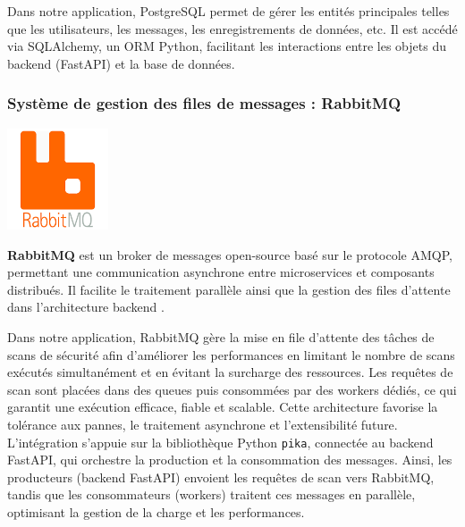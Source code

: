\begin{justify}
        Dans notre application, PostgreSQL permet de gérer les entités principales telles que les utilisateurs, les messages, les enregistrements de données, etc. Il est accédé via SQLAlchemy, un ORM Python, facilitant les interactions entre les objets du backend (FastAPI) et la base de données.
    \subsubsection{Système de gestion des files de messages : RabbitMQ}
        \begin{minipage}{0.25\textwidth}
            \centering
            \includegraphics[width=3cm]{chapitres/ch2/img/logiciel/rabbitmq.png}
        \end{minipage}
        \begin{minipage}{0.75\textwidth} 
            \justifying
            \textbf{RabbitMQ} est un broker de messages open-source basé sur le protocole AMQP, permettant une communication asynchrone entre microservices et composants distribués. Il facilite le traitement parallèle ainsi que la gestion des files d’attente dans l’architecture backend \cite{rabbitmq}.
        \end{minipage}
        
        Dans notre application, RabbitMQ gère la mise en file d’attente des tâches de scans de sécurité afin d’améliorer les performances en limitant le nombre de scans exécutés simultanément et en évitant la surcharge des ressources. Les requêtes de scan sont placées dans des queues puis consommées par des workers dédiés, ce qui garantit une exécution efficace, fiable et scalable. Cette architecture favorise la tolérance aux pannes, le traitement asynchrone et l’extensibilité future. L’intégration s’appuie sur la bibliothèque Python \texttt{pika}, connectée au backend FastAPI, qui orchestre la production et la consommation des messages. Ainsi, les producteurs (backend FastAPI) envoient les requêtes de scan vers RabbitMQ, tandis que les consommateurs (workers) traitent ces messages en parallèle, optimisant la gestion de la charge et les performances.
\end{justify}